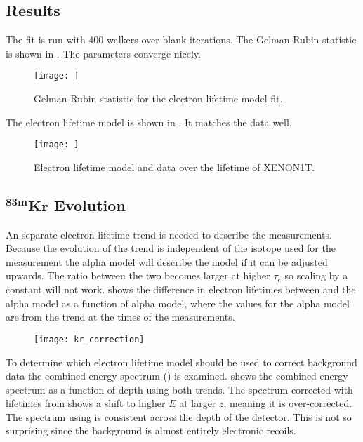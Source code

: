 \subsection{Results}
\label{subsec:elifetime_fit_results}
The fit is run with 400 walkers over blank iterations.   The Gelman-Rubin statistic is shown in
.  The parameters converge nicely.

\begin{figure}
\centering
\texttt{[image: ]}
\caption{Gelman-Rubin statistic for the electron lifetime model fit.}
\label{fig:elifetime_fit_results_gr}
\end{figure}

The electron lifetime model is shown in .  It matches the data well.

\begin{figure}
\centering
\texttt{[image: ]}
\caption{Electron lifetime model and data over the lifetime of XENON1T.}
\label{fig:elifetime_fit_results_elifetime}
\end{figure}



\subsection{$\mathbf{^{83m}Kr}$ Evolution}
\label{subsec:elifetime_fit_kr}
An separate electron lifetime trend is needed to describe the \metakr measurements.  Because the evolution of the trend is independent
of the isotope used for the measurement the alpha model will describe the \metakr model if it can be adjusted upwards.  The ratio
between the two becomes larger at higher $\tau_e$ so scaling by a constant will not work.   shows
the difference in electron lifetimes between \metakr and the alpha model as a function of alpha model, where the values for the alpha
model are from the trend at the times of the \metakr measurements.

\begin{figure}
\centering
\texttt{[image: kr\_correction]}
\caption{}
\label{fig:elifetime_fit_kr_correction}
\end{figure}

To determine which electron lifetime model should be used to correct background data the combined energy spectrum
() is examined.   shows the combined energy spectrum as a function
of depth using both trends.  The spectrum corrected with lifetimes from \alphadecays shows a shift to higher $E$ at larger $z$, meaning
it is over-corrected.  The spectrum using \metakr is consistent across the depth of the detector.  This is not so surprising since the
background is almost entirely electronic recoils.

